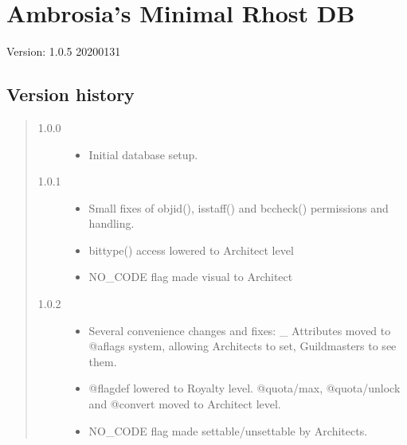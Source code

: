 \documentclass[letterpaper,10pt,english]{sphinxmanual}
\begin{document}
\chapter{Ambrosia’s Minimal Rhost DB}
\label{\detokenize{ambrosiadb:ambrosia-s-minimal-rhost-db}}\label{\detokenize{ambrosiadb:ambrosiadb-installation}}\label{\detokenize{ambrosiadb::doc}}
\sphinxAtStartPar
Version: 1.0.5          2020\sphinxhyphen{}01\sphinxhyphen{}31


\section{Version history}
\label{\detokenize{ambrosiadb:version-history}}\begin{quote}
\begin{description}
\item[{1.0.0}] \leavevmode\begin{itemize}
\item {} 
\sphinxAtStartPar
Initial database setup.

\end{itemize}

\item[{1.0.1}] \leavevmode\begin{itemize}
\item {} 
\sphinxAtStartPar
Small fixes of objid(), isstaff() and bccheck() permissions and handling.

\item {} 
\sphinxAtStartPar
bittype() access lowered to Architect level

\item {} 
\sphinxAtStartPar
NO\_CODE flag made visual to Architect

\end{itemize}

\item[{1.0.2}] \leavevmode\begin{itemize}
\item {} 
\sphinxAtStartPar
Several convenience changes and fixes: \_ Attributes moved to @aflags
system, allowing Architects to set, Guildmasters to see them.

\item {} 
\sphinxAtStartPar
@flagdef lowered to Royalty level. @quota/max, @quota/unlock and @convert
moved to Architect level.

\item {} 
\sphinxAtStartPar
NO\_CODE flag made settable/unsettable by Architects.


\end{itemize}
\end{description}
\end{quote}
\end{document}
